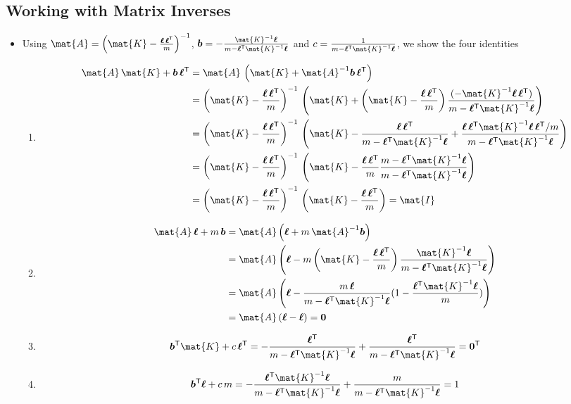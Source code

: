\documentclass[11pt]{article}
\newcommand{\tr}{\textsf{T}}
\newcommand{\vl}{\bm{\ell}}
\newcommand{\vb}{\bm{b}}
\begin{document}
\subsection{Working with Matrix Inverses}
\label{sec:org70578d1}
\begin{itemize}
\item Using \(\mat{A} = 
         \left(\mat{K}-\frac{\vl\,\vl^\tr}{m}\right)^{-1}\),
\(\vb=-\frac{\mat{K}^{-1} \vl}{m-\vl^\tr \mat{K}^{-1}\vl}\)
and \(c=\frac{1}{m-\vl^\tr \mat{K}^{-1}\vl}\), we show the four identities
\begin{enumerate}
\item \begin{align*}
\mat{A}\,\mat{K} + \vb\,\vl^\tr
&= \mat{A}\,\left(\mat{K} + \mat{A}^{-1} \vb\,\vl^\tr\right) \\
&=\left(\mat{K}-\frac{\vl\,\vl^\tr}{m}\right)^{-1} \,\left(\mat{K} +
\left(\mat{K}-\frac{\vl\,\vl^\tr}{m}\right)
 \frac{(-\mat{K}^{-1} \vl\,\vl^\tr)}{m-\vl^\tr \mat{K}^{-1}\vl} \right) \\
 &= \left(\mat{K}-\frac{\vl\,\vl^\tr}{m}\right)^{-1} \,\left(\mat{K} 
- \frac{\vl\,\vl^\tr}{m-\vl^\tr \mat{K}^{-1}\vl}
+ \frac{\vl\,\vl^\tr\mat{K}^{-1}\vl\,\vl^\tr/m}{m-\vl^\tr \mat{K}^{-1}\vl} \right)\\
&= \left(\mat{K}-\frac{\vl\,\vl^\tr}{m}\right)^{-1} \,\left(\mat{K} 
- \frac{\vl\,\vl^\tr}{m} 
  \frac{m-\vl^\tr \mat{K}^{-1}\vl}{m-\vl^\tr \mat{K}^{-1}\vl}\right) \\
&= \left(\mat{K}-\frac{\vl\,\vl^\tr}{m}\right)^{-1} \,\left(\mat{K} 
- \frac{\vl\,\vl^\tr}{m} \right) = \mat{I}
\end{align*}
\item \begin{align*}
\mat{A}\,\vl + m\,\vb 
&=  \mat{A} \left( \vl + m \,\mat{A}^{-1}\vb\right) \\
&= \mat{A} \left( \vl - m
\left(\mat{K}-\frac{\vl\,\vl^\tr}{m}\right)
 \frac{\mat{K}^{-1} \vl}{m-\vl^\tr \mat{K}^{-1}\vl} \right) \\
&=\mat{A} \left( \vl 
- \frac{m\,\vl}{m-\vl^\tr \mat{K}^{-1}\vl} (1 -\frac{\vl^\tr \mat{K}^{-1}\vl}{m}) \right)\\
&= \mat{A} \left( \vl -\vl \right) = \bm{0}
\end{align*}
\item $$ \vb^\tr\mat{K} + c\,\vl^\tr = -\frac{\vl^\tr}{m-\vl^\tr
          \mat{K}^{-1}\vl} + \frac{\vl^\tr}{m-\vl^\tr
          \mat{K}^{-1}\vl}= \bm{0}^\tr $$
\item $$ \vb^\tr \vl + c\,m =  -\frac{\vl^\tr \mat{K}^{-1} \vl}{m-\vl^\tr \mat{K}^{-1}\vl} + \frac{m}{m-\vl^\tr \mat{K}^{-1}\vl} = 1 $$
\end{enumerate}
\end{itemize}
\end{document}
